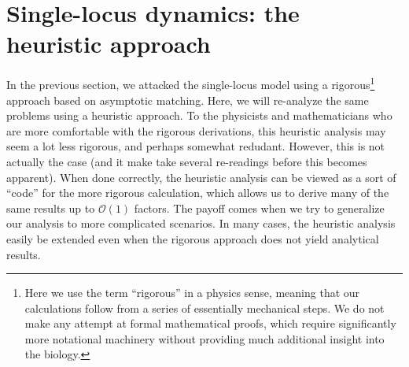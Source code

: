 \documentclass[11pt]{article}
\begin{document}
\section{Single-locus dynamics: the heuristic approach}

In the previous section, we attacked the single-locus model using a rigorous\footnote{Here we use the term ``rigorous'' in a physics sense, meaning that our calculations follow from a series of essentially mechanical steps. We do not make any attempt at formal mathematical proofs, which require significantly more notational machinery without providing much additional insight into the biology.} approach based on asymptotic matching. Here, we will re-analyze the same problems using a heuristic approach. To the physicists and mathematicians who are more comfortable with the rigorous derivations, this heuristic analysis may seem a lot less rigorous, and perhaps somewhat redudant. However, this is not actually the case (and it make take several re-readings before this becomes apparent). When done correctly, the heuristic analysis can be viewed as a sort of ``code'' for the more rigorous calculation, which allows us to derive many of the same results up to $\mathcal{O}(1)$ factors. The payoff comes when we try to generalize our analysis to more complicated scenarios. In many cases, the heuristic analysis easily be extended even when the rigorous approach does not yield analytical results.       
\end{document}
